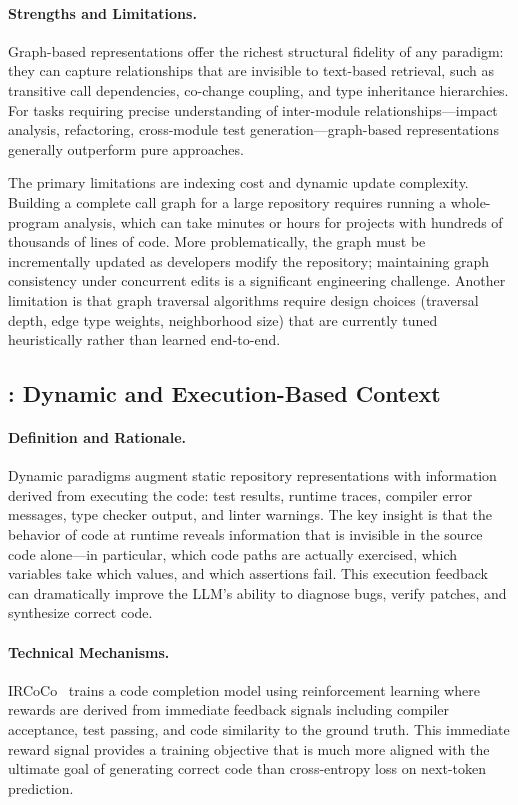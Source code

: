 \paragraph{Strengths and Limitations.}
Graph-based representations offer the richest structural fidelity of any paradigm: they can
capture relationships that are invisible to text-based retrieval, such as transitive call
dependencies, co-change coupling, and type inheritance hierarchies. For tasks requiring precise
understanding of inter-module relationships---impact analysis, refactoring, cross-module test
generation---graph-based representations generally outperform pure  approaches.

The primary limitations are indexing cost and dynamic update complexity. Building a complete
call graph for a large repository requires running a whole-program analysis, which can take
minutes or hours for projects with hundreds of thousands of lines of code. More problematically,
the graph must be incrementally updated as developers modify the repository; maintaining graph
consistency under concurrent edits is a significant engineering challenge. Another limitation
is that graph traversal algorithms require design choices (traversal depth, edge type weights,
neighborhood size) that are currently tuned heuristically rather than learned end-to-end.

\subsection{: Dynamic and Execution-Based Context}
\label{subsec:par4}

\paragraph{Definition and Rationale.}
Dynamic paradigms augment static repository representations with information derived from
executing the code: test results, runtime traces, compiler error messages, type checker
output, and linter warnings. The key insight is that the behavior of code at runtime reveals
information that is invisible in the source code alone---in particular, which code paths are
actually exercised, which variables take which values, and which assertions fail. This
execution feedback can dramatically improve the LLM's ability to diagnose bugs, verify patches,
and synthesize correct code.

\paragraph{Technical Mechanisms.}
IRCoCo~\cite{li2024ircoco} trains a code completion model using reinforcement learning where
rewards are derived from immediate feedback signals including compiler acceptance, test passing,
and code similarity to the ground truth. This immediate reward signal provides a training
objective that is much more aligned with the ultimate goal of generating correct code than
cross-entropy loss on next-token prediction.

